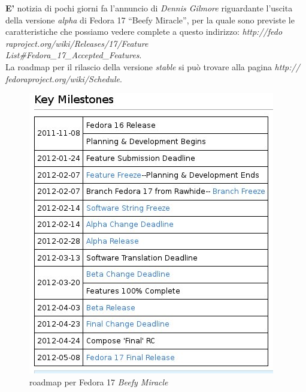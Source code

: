 \onehalfspacing
\lettrine[lines=1, loversize=0.1, lraise=0.1]{\color[cmyk]{0.5, 0, 1, 0}\bfseries E'}{} notizia di pochi giorni fa l'annuncio di {\itshape Dennis Gilmore} riguardante l'uscita della versione {\itshape alpha} di Fedora 17 ``Beefy Miracle'', per la quale sono previste le caratteristiche che possiamo vedere complete a questo indirizzo: {\itshape http://fedo\\raproject.org/wiki/Releases/17/Feature\\List\#Fedora\_17\_Accepted\_Features}.\\

La roadmap per il rilascio della versione {\itshape stable} si può trovare alla pagina {\itshape http://\\fedoraproject.org/wiki/Schedule}.\\

\begin{figure}[htbp]
\centering
\includegraphics[scale=.60]{articoli/notizie/immagini/roadmap_wiki.jpeg}
\caption{roadmap per Fedora 17 {\itshape Beefy Miracle}}
\end{figure}



